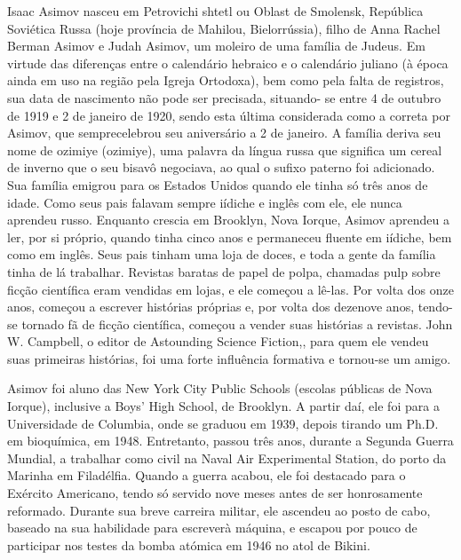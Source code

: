 \documentclass[14pt,portuguese]{extreport}
\newcommand\cyr
{
\renewcommand\rmdefault{wncyr}
\renewcommand\sfdefault{wncyss}
\renewcommand\encodingdefault{OT2}
\normalfont
\selectfont
}
\begin{document}
      Isaac Asimov nasceu em Petrovichi shtetl ou Oblast de
      Smolensk, República Soviética Russa (hoje província de Mahilou,
      Bielorrússia), filho de Anna Rachel Berman Asimov e Judah Asimov,
      um moleiro de uma família de Judeus. Em virtude das diferenças
      entre o calendário hebraico e o calendário juliano (à época ainda em
      uso na região pela Igreja Ortodoxa), bem como pela falta de
      registros, sua data de nascimento não pode ser precisada, situando-
      se entre 4 de outubro de 1919 e 2 de janeiro de 1920, sendo esta
      última considerada como a correta por Asimov, que semprecelebrou seu 
      aniversário a 2 de janeiro. A família deriva seu nome de
      {\cyr ozimiye} (ozimiye), uma palavra da língua russa que significa um
      cereal de inverno que o seu bisavô negociava, ao qual o sufixo
      paterno foi adicionado. Sua família emigrou para os Estados Unidos
      quando ele tinha só três anos de idade. Como seus pais falavam
      sempre iídiche e inglês com ele, ele nunca aprendeu russo. Enquanto
      crescia em Brooklyn, Nova Iorque, Asimov aprendeu a ler, por si
      próprio, quando tinha cinco anos e permaneceu fluente em iídiche,
      bem como em inglês. Seus pais tinham uma loja de doces, e toda a
      gente da família tinha de lá trabalhar. Revistas baratas de papel de
      polpa, chamadas pulp sobre ficção científica eram vendidas em lojas,
      e ele começou a lê-las. Por volta dos onze anos, começou a escrever
      histórias próprias e, por volta dos dezenove anos, tendo-se tornado
      fã de ficção científica, começou a vender suas histórias a revistas.
      John W. Campbell, o editor de Astounding Science Fiction,, para
      quem ele vendeu suas primeiras histórias, foi uma forte influência
      formativa e tornou-se um amigo.
      
      Asimov foi aluno das New York City Public Schools (escolas
      públicas de Nova Iorque), inclusive a Boys' High School, de Brooklyn.
      A partir daí, ele foi para a Universidade de Columbia, onde se
      graduou em 1939, depois tirando um Ph.D. em bioquímica, em 1948.
      Entretanto, passou três anos, durante a Segunda Guerra Mundial, a
      trabalhar como civil na Naval Air Experimental Station, do porto da
      Marinha em Filadélfia. Quando a guerra acabou, ele foi destacado
      para o Exército Americano, tendo só servido nove meses antes de
      ser honrosamente reformado. Durante sua breve carreira militar, ele
      ascendeu ao posto de cabo, baseado na sua habilidade para escreverà máquina, 
      e escapou por pouco de participar nos testes da bomba
      atómica em 1946 no atol de Bikini.
      
\end{document}
